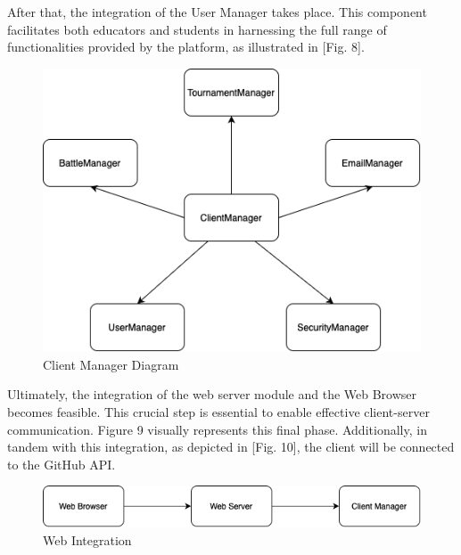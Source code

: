 \documentclass[12pt,oneside,a4paper]{article}
\begin{document}
\begin{flushleft}
    After that, the integration of the User Manager takes place. This component facilitates both educators and students in harnessing the full range of functionalities provided by the platform, as illustrated in [Fig. 8].
\end{flushleft}

\begin{figure}[htbp]
    \centering
    \includegraphics[scale=0.55]{Images/Diagrams/ClientManager.png}
    \caption{Client Manager Diagram}
    \label{fig:enter-label}
\end{figure}

\clearpage

\begin{flushleft}
    Ultimately, the integration of the web server module and the Web Browser becomes feasible. This crucial step is essential to enable effective client-server communication. Figure 9 visually represents this final phase. Additionally, in tandem with this integration, as depicted in [Fig. 10], the client will be connected to the GitHub API.
\end{flushleft}

\begin{figure}[htbp]
    \centering
    \includegraphics[scale=0.55]{Images/Diagrams/WebServer.png}
    \caption{Web Integration}
    \label{fig:enter-label}
\end{figure}
\end{document}
